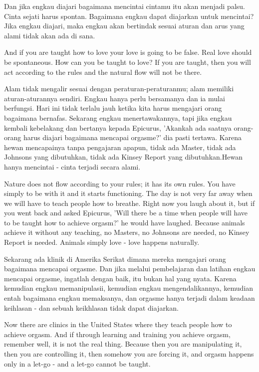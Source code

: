 \bahasa
Dan jika engkau diajari bagaimana mencintai cintamu itu akan menjadi palsu. Cinta sejati harus spontan. Bagaimana engkau dapat diajarkan untuk mencintai? Jika engkau diajari, maka engkau akan bertindak sesuai aturan dan arus yang alami tidak akan ada di sana.

\english
And if you are taught how to love your love is going to be false. Real love should be spontaneous. How can you be taught to love? If you are taught, then you will act according to the rules and the natural flow will not be there.

\bahasa
Alam tidak mengalir sesuai dengan peraturan-peraturanmu; alam memiliki aturan-aturannya sendiri. Engkau hanya perlu bersamanya dan ia mulai berfungsi. Hari ini tidak terlalu jauh ketika kita harus mengajari orang bagaimana bernafas. Sekarang engkau menertawakannya, tapi jika engkau kembali kebelakang dan bertanya kepada Epicurus, 'Akankah ada saatnya orang-orang harus diajari bagaimana mencapai orgasme?' dia pasti tertawa. Karena hewan mencapainya tanpa pengajaran apapun, tidak ada Master, tidak ada Johnsons yang dibutuhkan, tidak ada Kinsey Report yang dibutuhkan.Hewan hanya mencintai - cinta terjadi secara alami.

\english
Nature does not flow according to your rules; it has its own rules. You have simply to be with it and it starts functioning. The day is not very far away when we will have to teach people how to breathe. Right now you laugh about it, but if you went back and asked Epicurus, 'Will there be a time when people will have to be taught how to achieve orgasm?' he would have laughed. Because animals achieve it without any teaching, no Masters, no Johnsons are needed, no Kinsey Report is needed. Animals simply love - love happens naturally.

\bahasa
Sekarang ada klinik di Amerika Serikat dimana mereka mengajari orang bagaimana mencapai orgasme. Dan jika melalui pembelajaran dan latihan engkau mencapai orgasme, ingatlah dengan baik, itu bukan hal yang nyata. Karena kemudian engkau memanipulasii, kemudian engkau mengendalikannya, kemudian entah bagaimana engkau memaksanya, dan orgasme hanya terjadi dalam keadaan keihlasan - dan sebuah keikhlasan tidak dapat diajarkan.

\english
Now there are clinics in the United States where they teach people how to achieve orgasm. And if through learning and training you achieve orgasm, remember well, it is not the real thing. Because then you are manipulating it, then you are controlling it, then somehow you are forcing it, and orgasm happens only in a let-go - and a let-go cannot be taught.


